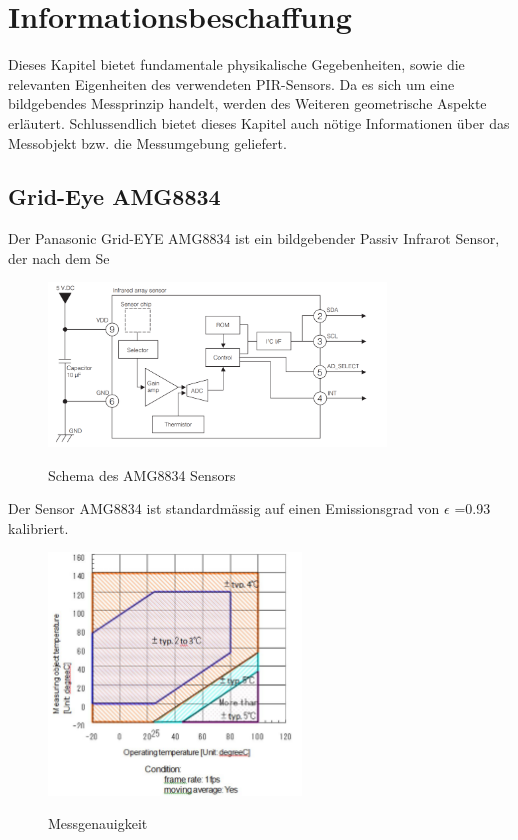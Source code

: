 \chapter{Informationsbeschaffung}
\label{chap:Informationsbeschaffung}
Dieses Kapitel bietet fundamentale physikalische Gegebenheiten, sowie die relevanten Eigenheiten des verwendeten  \ac{PIR}-Sensors. Da es sich um eine bildgebendes Messprinzip handelt, werden des Weiteren geometrische Aspekte erläutert. Schlussendlich bietet dieses Kapitel auch nötige Informationen über das Messobjekt bzw. die Messumgebung geliefert.




\section{Grid-Eye AMG8834}

Der Panasonic Grid-EYE AMG8834 ist ein bildgebender Passiv Infrarot Sensor, der nach dem Se 

\begin{figure}[H]
	\centering
	\includegraphics[width=0.8\textwidth]
	{fig/Circuit_AMG8834.PNG}
	\caption[Schema des AMG8834 Sensors]{Schema des AMG8834 Sensors} \protect\cite{AMG8834}
	\label{fig:SchemaAMG8834}
\end{figure}

Der Sensor AMG8834 ist standardmässig auf einen Emissionsgrad von $\epsilon$ =0.93 kalibriert.

\begin{figure}[H]
	\centering
	\includegraphics[width=0.6\textwidth]
	{fig/accuracy.PNG}
	\caption[Messgenauigkeit]{Messgenauigkeit} \protect\cite{AMG8834}
	\label{fig:Temperaturbereich}
\end{figure}

